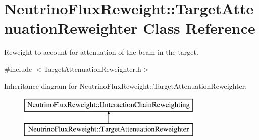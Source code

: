 \hypertarget{class_neutrino_flux_reweight_1_1_target_attenuation_reweighter}{\section{Neutrino\-Flux\-Reweight\-:\-:Target\-Attenuation\-Reweighter Class Reference}
\label{class_neutrino_flux_reweight_1_1_target_attenuation_reweighter}
}


Reweight to account for attenuation of the beam in the target.  




{\ttfamily \#include $<$Target\-Attenuation\-Reweighter.\-h$>$}

Inheritance diagram for Neutrino\-Flux\-Reweight\-:\-:Target\-Attenuation\-Reweighter\-:\begin{figure}[H]
\begin{center}
\leavevmode
\includegraphics[height=2.000000cm]{class_neutrino_flux_reweight_1_1_target_attenuation_reweighter}
\end{center}
\end{figure}
